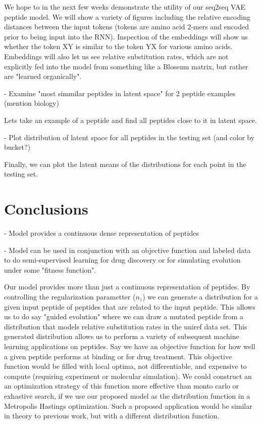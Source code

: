 \documentclass[preprint,12pt]{elsarticle}
\begin{document}
We hope to in the next few weeks demonstrate the utility of our seq2seq VAE peptide model. We will show a variety of figures including the relative encoding distances between the input tokens (tokens are amino acid 2-mers and encoded prior to being input into the RNN). Inspection of the embeddings will show us whether the token XY is similar to the token YX for various amino acids. Embeddings will also let us see relative substitution rates, which are not explicitly fed into the model from something like a Blossum matrix, but rather are "learned organically".

- Examine "most simmilar peptides in latent space" for 2 peptide examples (mention biology)

Lets take an example of a peptide and find all peptides close to it in latent space.

- Plot distribution of latent space for all peptides in the testing set (and color by bucket?)

Finally, we can plot the latent means of the distributions for each point in the testing set.

\section{Conclusions}

- Model provides a continuous dense representation of peptides

- Model can be used in conjunction with an objective function and labeled data to do semi-supervised learning for drug discovery or for simulating evolution under some "fitness function".

Our model provides more than just a continuous representation of peptides. By controlling the regularization parametter ($n_z$) we can generate a distribution for a given input peptide of peptides that are related to the input peptide. This allows us to do say "guided evolution" where we can draw a mutated peptide from a distribution that models relative substitution rates in the uniref data set. This generated distribution allows us to perform a variety of subsequent machine learning applications on peptides. Say we have an objective function for how well a given peptide performs at binding or for drug treatment. This objective function would be filled with local optima, not differentiable, and expensive to compute (requiring experiment or molecular simulation). We could construct an an optimization strategy of this function more effective than monto carlo or exhastive search, if we use our proposed model as the distribution function in a Metropolis Hastings optimization. Such a proposed application would be similar in theory to previous work, but with a different distribution function\cite{giguere2013improved}.
\end{document}
